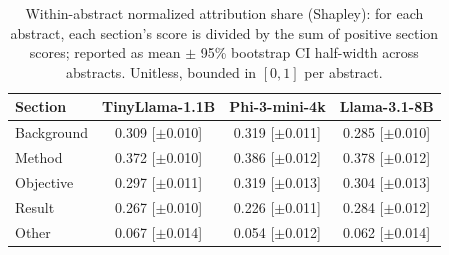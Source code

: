 \begin{table}[t]
\centering
\caption{Within-abstract normalized attribution share (Shapley): for each abstract, each section's score is divided by the sum of positive section scores; reported as mean $\pm$ 95\% bootstrap CI half-width across abstracts. Unitless, bounded in $[0, 1]$ per abstract.}
\label{tab:normalized_share}
\small
\begin{tabular}{lccc}
\toprule
\textbf{Section} & \textbf{TinyLlama-1.1B} & \textbf{Phi-3-mini-4k} & \textbf{Llama-3.1-8B} \\
\midrule
Background & 0.309 [$\pm$0.010] & 0.319 [$\pm$0.011] & 0.285 [$\pm$0.010] \\
Method & 0.372 [$\pm$0.010] & 0.386 [$\pm$0.012] & 0.378 [$\pm$0.012] \\
Objective & 0.297 [$\pm$0.011] & 0.319 [$\pm$0.013] & 0.304 [$\pm$0.013] \\
Result & 0.267 [$\pm$0.010] & 0.226 [$\pm$0.011] & 0.284 [$\pm$0.012] \\
Other & 0.067 [$\pm$0.014] & 0.054 [$\pm$0.012] & 0.062 [$\pm$0.014] \\
\bottomrule
\end{tabular}
\end{table}